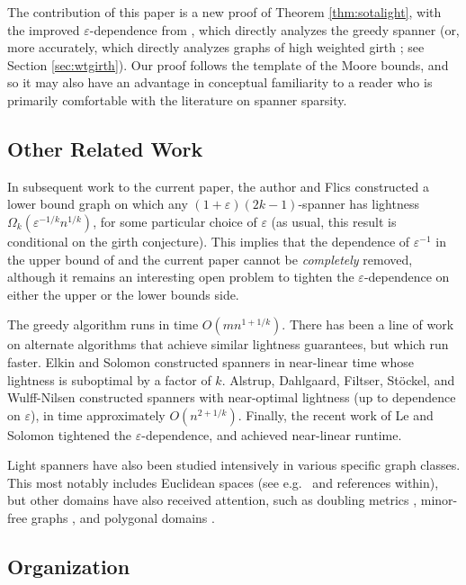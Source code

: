 \documentclass{article}\usepackage[a4paper,margin=20mm]{geometry}
\newcommand{\eps}{\varepsilon}
\begin{document}
The contribution of this paper is a new proof of Theorem \ref{thm:sotalight}, with the improved $\eps$-dependence from \cite{LS23}, which directly analyzes the greedy spanner (or, more accurately, which directly analyzes graphs of high weighted girth \cite{ENS15}; see Section \ref{sec:wtgirth}).
Our proof follows the template of the Moore bounds, and so it may also have an advantage in conceptual familiarity to a reader who is primarily comfortable with the literature on spanner sparsity.

\subsection{Other Related Work}

In subsequent work to the current paper, the author and Flics \cite{BF24} constructed a lower bound graph on which any $(1+\eps)(2k-1)$-spanner has lightness $\Omega_k(\eps^{-1/k} n^{1/k})$, for some particular choice of $\eps$ (as usual, this result is conditional on the girth conjecture).
This implies that the dependence of $\eps^{-1}$ in the upper bound of \cite{LS23} and the current paper cannot be \emph{completely} removed, although it remains an interesting open problem to tighten the $\eps$-dependence on either the upper or the lower bounds side.

The greedy algorithm runs in time $O(mn^{1+1/k})$.
There has been a line of work on alternate algorithms that achieve similar lightness guarantees, but which run faster.
Elkin and Solomon \cite{ES16} constructed spanners in near-linear time whose lightness is suboptimal by a factor of $k$.
Alstrup, Dahlgaard, Filtser, St\"{o}ckel, and Wulff-Nilsen \cite{ADFSW22} constructed spanners with near-optimal lightness (up to dependence on $\eps$), in time approximately $O(n^{2 + 1/k})$.
Finally, the recent work of Le and Solomon \cite{LS23} tightened the $\eps$-dependence, and achieved near-linear runtime.

Light spanners have also been studied intensively in various specific graph classes.
This most notably includes Euclidean spaces (see e.g.\ \cite{FS20, LS23, NS07, ES15} and references within), but other domains have also received attention, such as doubling metrics \cite{KLMS22, LT24, BLW19, CLNS15, CLN15, CG09, GR08}, minor-free graphs \cite{BLW17}, and polygonal domains \cite{BKKLLPT24}.

\subsection{Organization}
\end{document}
